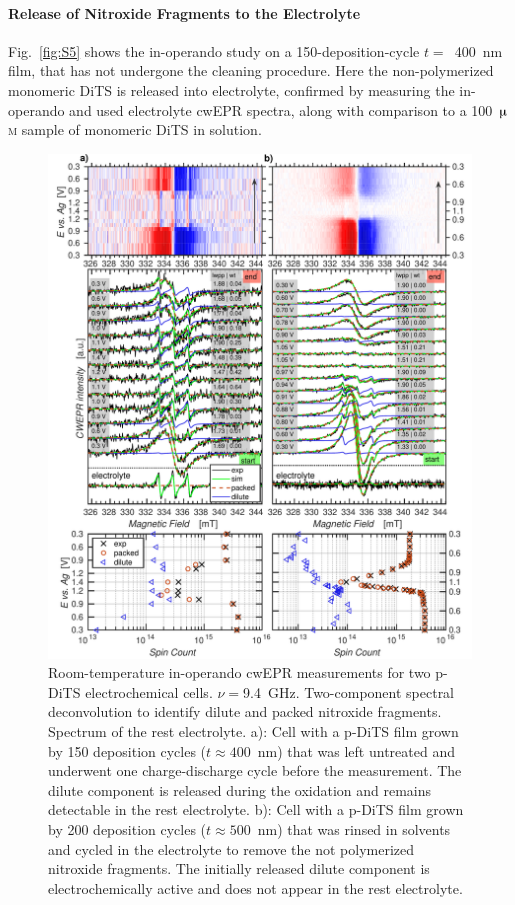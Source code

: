 \paragraph{Release of Nitroxide Fragments to the Electrolyte}
Fig.~\ref{fig:S5} shows the in-operando study on a 150-deposition-cycle $t =$~400~nm film, that has not undergone the cleaning procedure. Here the non-polymerized monomeric DiTS is released into electrolyte, confirmed by measuring the in-operando and used electrolyte cwEPR spectra, along with comparison to a 100~$\muup$\textsc{m} sample of monomeric DiTS in solution.
\newpage
\begin{figure}[H]
\center
	\includegraphics[width=1\textwidth]{./operando_epr/figures/degradation/operando_degradation_dits.pdf}
\caption{Room-temperature in-operando cwEPR measurements for two p-DiTS electrochemical cells. $\nu=$9.4~GHz. Two-component spectral deconvolution to identify dilute and packed nitroxide fragments. Spectrum of the rest electrolyte. a): Cell with a p-DiTS film grown by 150 deposition cycles ($t\approx 400$~nm) that was left untreated and underwent one charge-discharge cycle before the measurement. The dilute component is released during the oxidation and remains detectable in the rest electrolyte. b): Cell with a p-DiTS film grown by 200 deposition cycles ($t\approx 500$~nm) that was rinsed in solvents and cycled in the electrolyte to remove the not polymerized nitroxide fragments. The initially released dilute component is electrochemically active and does not appear in the rest electrolyte.}
\label{fig:S6}
\end{figure}


